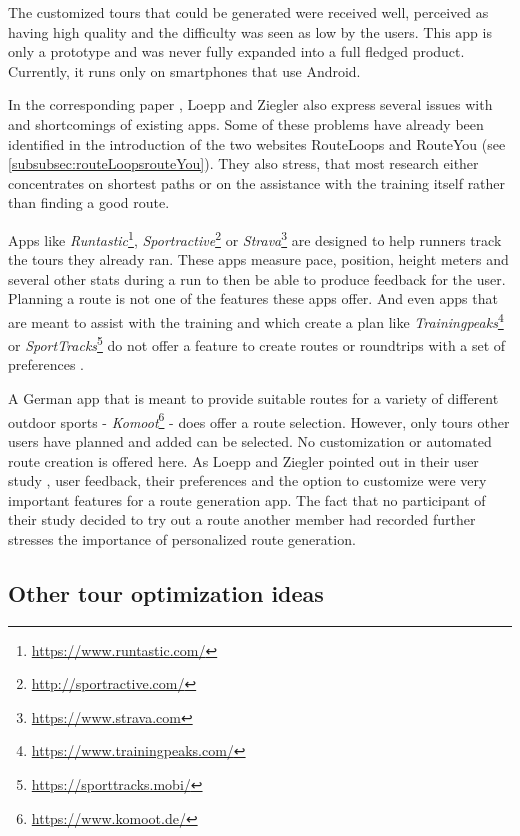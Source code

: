 The customized tours that could be generated were received well, perceived as having high quality and the difficulty was seen as low by the users.
This app is only a prototype and was never fully expanded into a full fledged product.
Currently, it runs only on smartphones that use Android. 

In the corresponding paper \cite{loepp_recommending_2018}, Loepp and Ziegler also express several issues with and shortcomings of existing apps.
Some of these problems have already been identified in the introduction of the two websites RouteLoops and RouteYou (see \ref{subsubsec:routeLoopsrouteYou}).
They also stress, that most research either concentrates on shortest paths or on the assistance with the training itself rather than finding a good route.

Apps like \textit{Runtastic}\footnote{\url{https://www.runtastic.com/}}, \textit{Sportractive}\footnote{\url{http://sportractive.com/}} or \textit{Strava}\footnote{\url{https://www.strava.com}} are designed to help runners track the tours they already ran. 
These apps measure pace, position, height meters and several other stats during a run to then be able to produce feedback for the user. 
Planning a route is not one of the features these apps offer.
And even apps that are meant to assist with the training and which create a plan like \textit{Trainingpeaks}\footnote{\url{https://www.trainingpeaks.com/}} or \textit{SportTracks}\footnote{\url{https://sporttracks.mobi/}} do not offer a feature to create routes or roundtrips with a set of preferences \cite{loepp_recommending_2018}.

A German app that is meant to provide suitable routes for a variety of different outdoor sports - \textit{Komoot}\footnote{\url{https://www.komoot.de/}} - does offer a route selection. 
However, only tours other users have planned and added can be selected. 
No customization or automated route creation is offered here. 
As Loepp and Ziegler pointed out in their user study \cite{loepp_recommending_2018}, user feedback, their preferences and the option to customize were very important features for a route generation app. 
The fact that no participant of their study decided to try out a route another member had recorded further stresses the importance of personalized route generation.


\subsection{Other tour optimization ideas}
\label{subsec:otherTourOptimization}

